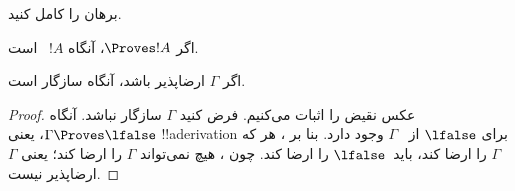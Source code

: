 \documentclass[../../../include/open-logic-section]{subfiles}
\begin{document}
\begin{prob}
  برهان  را کامل کنید.
\end{prob}
\tagendprob

\begin{cor}
اگر $\Proves !A$، آنگاه $!A$~ است.
\end{cor}

\begin{cor}
اگر $\Gamma$ ارضاپذیر باشد، آنگاه سازگار است.
\end{cor}

\begin{proof}
عکس نقیض را اثبات می‌کنیم. فرض کنید $\Gamma$ سازگار نباشد. آنگاه
$\Gamma \Proves \lfalse$، یعنی !!a{derivation} برای $\lfalse$ از
~$\Gamma$ وجود دارد. بنا بر ، هر
که $\Gamma$ را ارضا کند، باید~$\lfalse$ را ارضا کند. چون
، هیچ
 نمی‌تواند $\Gamma$ را ارضا
کند؛ یعنی $\Gamma$ ارضاپذیر نیست.
\end{proof}
\end{document}
